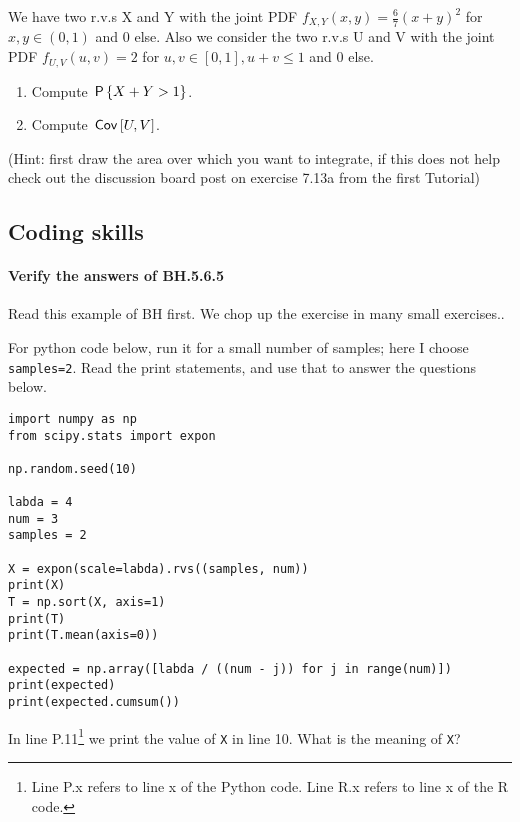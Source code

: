 \documentclass[assignments]{subfiles}
\begin{document}
\begin{exercise}
We have two r.v.s X and Y with the joint PDF $f_{X,Y}(x,y) = \frac{6}{7}(x+y)^2$ for $x, y \in (0,1)$ and 0 else. Also we consider the two r.v.s U and V with the joint PDF $f_{U,V}(u,v) = 2$ for $u, v \in [0,1], u+v \leq 1$ and 0 else.
\begin{enumerate}
\item Compute $\P{X+Y>1}$.
\item Compute $\cov{U,V}$.
\end{enumerate}
(Hint: first draw the area over which you want to integrate, if this does not help check out the discussion board post on exercise 7.13a from the first Tutorial)
\end{exercise}


\subsection{Coding skills}
\label{sec:progr-assignm}


\paragraph{Verify the answers of BH.5.6.5}
Read this example of BH first.
We chop up the exercise in many small exercises..


For python code below, run it for a small number of samples; here I choose \texttt{samples=2}. Read the print statements, and use that to answer the questions below.

\begin{verbatim}
import numpy as np
from scipy.stats import expon

np.random.seed(10)

labda = 4
num = 3
samples = 2

X = expon(scale=labda).rvs((samples, num))
print(X)
T = np.sort(X, axis=1)
print(T)
print(T.mean(axis=0))

expected = np.array([labda / ((num - j)) for j in range(num)])
print(expected)
print(expected.cumsum())
\end{verbatim}


\begin{exercise}
In line P.11\footnote{Line P.x refers to line x of the Python code.
  Line R.x refers to line x of the R code.}
we print the value of \texttt{X} in line 10.
What is the meaning of \texttt{X}?
\begin{solution}
\end{solution}
\end{exercise}
\end{document}
